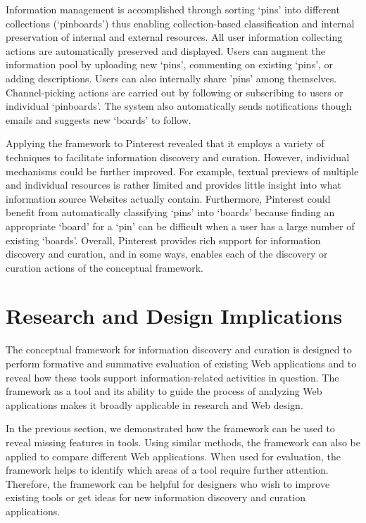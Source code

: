 \documentclass[review]{elsarticle}
\newcommand{\feature}[1]{{\ttfamily#1}}
\begin{document}
{{Information management is accomplished through sorting `pins' into different collections (`pinboards') thus enabling \feature{collection-based classification} and \feature{internal preservation of internal and external resources}. All user information collecting actions are \feature{automatically} preserved and displayed. Users can augment the information pool by uploading new `pins', commenting on existing `pins', or adding descriptions. Users can also \feature{internally share} 'pins' among themselves. Channel-picking actions are carried out by following or \feature{subscribing} to users or individual `pinboards'. The system also \feature{automatically} sends \feature{notifications} though emails and \feature{suggests} new `boards' to follow.

Applying the framework to Pinterest revealed that it employs a  variety of techniques to facilitate information discovery and curation. However, individual mechanisms could be further improved. For example, \feature{textual previews} of multiple and individual resources is rather limited and provides little insight into what information source Websites actually contain. Furthermore, Pinterest could benefit from \feature{automatically classifying} `pins' into `boards' because finding an appropriate `board' for a `pin' can be difficult when a user has a large number of existing `boards'. Overall, Pinterest provides rich support for information discovery and curation, and in some ways, enables each of the discovery or curation actions of the conceptual framework. 
} %

\section{Research and Design Implications}
\label{section:implications}
The conceptual framework for information discovery and curation is designed to perform formative and summative evaluation of existing Web applications and to reveal how these tools support information-related activities in question. The framework as a tool and its ability to guide the process of analyzing Web applications makes it broadly applicable in research and Web design. 

In the previous section, we demonstrated how the framework can be used to reveal missing features in tools. Using similar methods, the framework can also be applied to compare different Web applications. When used for evaluation, the framework helps to identify which areas of a tool require further attention. Therefore, the framework can be helpful for designers who wish to improve existing tools or get ideas for new information discovery and curation applications. 

}
\end{document}
